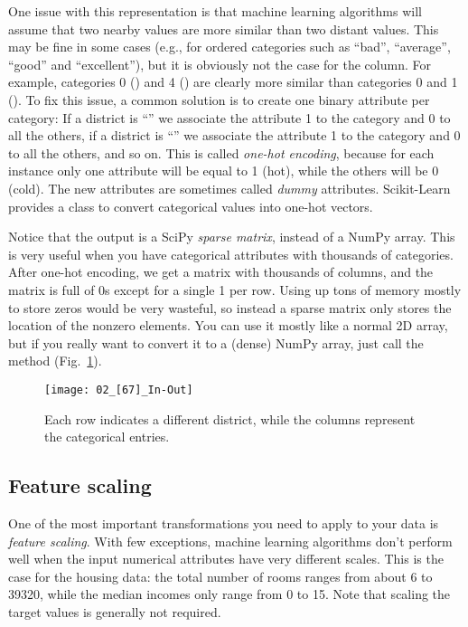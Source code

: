 One issue with this representation is that machine learning algorithms will assume that two nearby values are more similar than two distant values. This may be fine in some cases (e.g., for ordered categories such as ``bad'', ``average'', ``good'' and ``excellent''), but it is obviously not the case for the  column. For example, categories 0 () and 4 () are clearly more similar than categories 0 and 1 (). To fix this issue, a common solution is to create one binary attribute per category:
If a district is ``'' we associate the attribute 1 to the  category and 0 to all the others, if a district is ``'' we associate the attribute 1 to the  category and 0 to all the others, and so on. This is called \emph{one-hot encoding}, because for each instance only one attribute will be equal to 1 (hot), while the others will be 0 (cold). The new attributes are sometimes called \emph{dummy} attributes. Scikit-Learn provides a  class to convert categorical values into one-hot vectors.

Notice that the output is a SciPy \emph{sparse matrix}, instead of a NumPy array. This is very useful when you have categorical attributes with thousands of categories. After one-hot encoding, we get a matrix with thousands of columns, and the matrix is full of 0s except for a single 1 per row. Using up tons of memory mostly to store zeros would be very wasteful, so instead a sparse matrix only stores the location of the nonzero elements. You can use it mostly like a normal 2D array, but if you really want to convert it to a (dense) NumPy array, just call the  method (Fig.~\ref{02_[67]_In-Out}).
\begin{figure}[h!t]
\centering
\texttt{[image: 02\_[67]\_In-Out]}
\caption{Each row indicates a different district, while the columns represent the categorical entries.}\label{02_[67]_In-Out}
\end{figure}
\subsection{Feature scaling}
One of the most important transformations you need to apply to your data is \emph{feature scaling}. With few exceptions, machine learning algorithms don't perform well when the input numerical attributes have very different scales. This is the case for the housing data: the total number of rooms ranges from about 6 to \num{39320}, while the median incomes only range from 0 to 15. Note that scaling the target values is generally not required.

